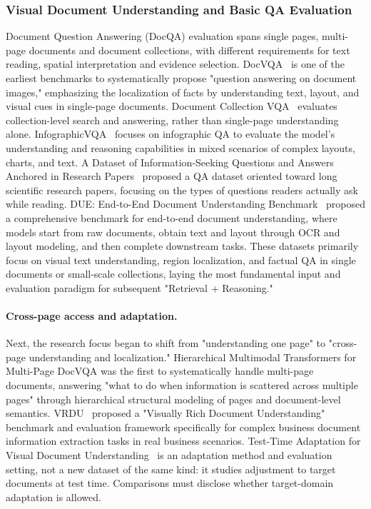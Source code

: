 \subsubsection{Visual Document Understanding and Basic QA Evaluation}

Document Question Answering (DocQA) evaluation spans single pages, multi-page documents and document collections, with different requirements for text reading, spatial interpretation and evidence selection. DocVQA~\cite{docvqa2020} is one of the earliest benchmarks to systematically propose "question answering on document images," emphasizing the localization of facts by understanding text, layout, and visual cues in single-page documents. Document Collection VQA~\cite{doccollectionvqa2021} evaluates collection-level search and answering, rather than single-page understanding alone. InfographicVQA~\cite{infographicvqa2021} focuses on infographic QA to evaluate the model's understanding and reasoning capabilities in mixed scenarios of complex layouts, charts, and text. A Dataset of Information-Seeking Questions and Answers Anchored in Research Papers~\cite{infoseekqa2021} proposed a QA dataset oriented toward long scientific research papers, focusing on the types of questions readers actually ask while reading. DUE: End-to-End Document Understanding Benchmark~\cite{due2021} proposed a comprehensive benchmark for end-to-end document understanding, where models start from raw documents, obtain text and layout through OCR and layout modeling, and then complete downstream tasks. These datasets primarily focus on visual text understanding, region localization, and factual QA in single documents or small-scale collections, laying the most fundamental input and evaluation paradigm for subsequent "Retrieval + Reasoning."

\paragraph{Cross-page access and adaptation.}
Next, the research focus began to shift from "understanding one page" to "cross-page understanding and localization." Hierarchical Multimodal Transformers for Multi-Page DocVQA \cite{tito2023hierarchicalmultimodaltransformersmultipage} was the first to systematically handle multi-page documents, answering "what to do when information is scattered across multiple pages" through hierarchical structural modeling of pages and document-level semantics. VRDU~\cite{vrdu2023} proposed a "Visually Rich Document Understanding" benchmark and evaluation framework specifically for complex business document information extraction tasks in real business scenarios. Test-Time Adaptation for Visual Document Understanding~\cite{tta-vdu2023} is an adaptation method and evaluation setting, not a new dataset of the same kind: it studies adjustment to target documents at test time. Comparisons must disclose whether target-domain adaptation is allowed.

